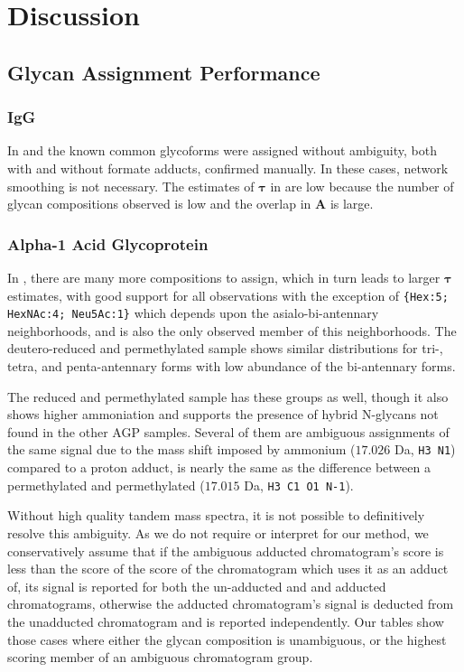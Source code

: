 \section{Discussion}

\subsection{Glycan Assignment Performance}

    \subsubsection{IgG}
        In \igg and \agp the known common glycoforms were assigned without ambiguity,
    both with and without formate adducts, confirmed manually. In these cases,
    network smoothing is not necessary. The estimates of $\mathbf{\tau}$ in \igg
    are low because the number of glycan compositions observed is low and the overlap
    in $\mathbf{A}$ is large.

    \subsubsection{Alpha-1 Acid Glycoprotein}
        In \agp, there are many more compositions to assign, which in turn leads to
    larger $\mathbf{\tau}$ estimates, with good support for all observations with the
    exception of \texttt{\{Hex:5; HexNAc:4; Neu5Ac:1\}} which depends upon the
    asialo-bi-antennary neighborhoods, and is also the only observed member of this
    neighborhoods. The deutero-reduced and permethylated sample \dpagp shows similar
    distributions for tri-, tetra, and penta-antennary forms with low abundance of
    the bi-antennary forms.

    The reduced and permethylated sample \rpagp has these groups
    as well, though it also shows higher ammoniation and supports the presence of
    hybrid N-glycans not found in the other AGP samples. Several of them are
    ambiguous assignments of the same signal due to the mass shift imposed by ammonium
    ($17.026$ Da, \texttt{H3 N1}) compared to a proton adduct, is nearly the same as the
    difference between a permethylated  and permethylated
     ($17.015$ Da, \texttt{H3 C1 O1 N-1}).

    Without high quality tandem mass spectra, it is not possible to definitively
    resolve this ambiguity. As we do not require or interpret for our method, we
    conservatively assume that if the ambiguous adducted chromatogram's score is less than the score
    of the score of the chromatogram which uses it as an adduct of, its signal is reported
    for both the un-adducted and and adducted chromatograms, otherwise the adducted
    chromatogram's signal is deducted from the unadducted chromatogram and is reported
    independently. Our tables show those cases where either the glycan composition is
    unambiguous, or the highest scoring member of an ambiguous chromatogram group.


